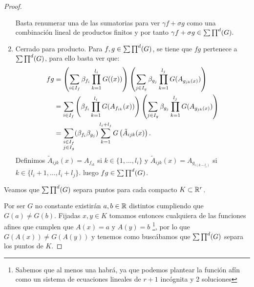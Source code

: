\begin{proof}
\begin{enumerate}
        Basta renumerar una de las sumatorias para ver $\gamma f+ \sigma g$ como una combinación 
        lineal de productos finitos y por tanto $\gamma f+ \sigma g \in \sum \prod^d (G).$
        
      
        \item Cerrado para producto. Para $f,g \in \sum \prod^d (G)$, se tiene que $fg$ pertenece a $\sum \prod^d (G)$, para ello basta ver que: 
        \begin{align}
           f g & = 
           \left(
               \sum_{i \in I_f} \beta_{f_i} \prod_{k=1}^{l_i} G((x)) 
           \right) 
           \left(
               \sum_{j \in I_g} \beta_{g_j} \prod_{k=1}^{l_j} G(A_{g_{j k}(x)}) 
           \right) 
           \\
           & = 
            \sum_{i \in I_f} 
            \left(
                \beta_{f_i} \prod_{k=1}^{l_i} G(A_{f_{i k}}(x)) 
           \right) 
           \left(
               \sum_{j \in I_g} \beta_{g_j} \prod_{k=1}^{l_j} G(A_{g_{j k}(x)}) 
           \right) 
           \\
           & = 
           \sum_{
               \begin{subarray}{c}
                i \in I_f \\
                j \in I_g
               \end{subarray}
               }
               (\beta_{f_i} \beta_{g_j})
               \sum_{k = 1}^{l_i + l_j}G 
               \left(
                    \tilde{A}_{i j k}(x)
               \right).
        \end{align}
        Definimos $\tilde{A}_{i j k}(x) = A_{f_{i k}}$ si $k \in \{1, \ldots, l_i\}$
        y $\tilde{A}_{i j k}(x) = A_{g_{i (k - l_i)}}$ si $k \in \{l_i + 1, \ldots, l_i+l_j\}$.
        luego $fg \in \sum \prod^d (G)$. 
    \end{enumerate}

    Veamos que $\sum \prod^d (G)$ separa puntos para cada compacto $K \subset \mathbb{R}^r$. 

    Por ser $G$ no constante existirán $a,b \in \mathbb{R}$ distintos cumpliendo que $G(a) \neq G(b)$. Fijadas $x,y \in K$ tomamos entonces cualquiera de las 
    funciones afines que cumplen que $A(x) = a$ y $A(y)=b$ 
    \footnote{Sabemos que al menos una habrá, ya que podemos plantear la función afín
    como un sistema de ecuaciones lineales de $r+1$ incógnita y 2 soluciones}, 
    por lo que $G(A(x)) \neq G(A(y))$ y tenemos como buscábamos que $\sum \prod^d (G)$ separa los puntos de $K$. 


\end{proof}
